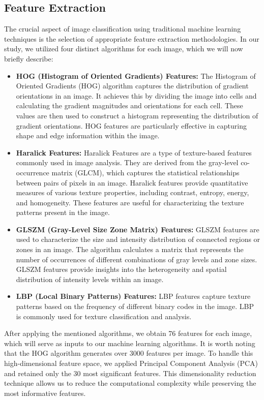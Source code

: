 \subsection{Feature Extraction}
The crucial aspect of image classification using traditional machine learning techniques is the selection of appropriate feature extraction methodologies. In our study, we utilized four distinct algorithms for each image, which we will now briefly describe:
\begin{itemize}
\item \textbf{HOG (Histogram of Oriented Gradients) Features:} The Histogram of Oriented Gradients (HOG) algorithm captures the distribution of gradient orientations in an image. It achieves this by dividing the image into cells and calculating the gradient magnitudes and orientations for each cell. These values are then used to construct a histogram representing the distribution of gradient orientations. HOG features are particularly effective in capturing shape and edge information within the image.
\item \textbf{Haralick Features:} Haralick Features are a type of texture-based features commonly used in image analysis. They are derived from the gray-level co-occurrence matrix (GLCM), which captures the statistical relationships between pairs of pixels in an image. Haralick features provide quantitative measures of various texture properties, including contrast, entropy, energy, and homogeneity. These features are useful for characterizing the texture patterns present in the image.
\item \textbf{GLSZM (Gray-Level Size Zone Matrix) Features:} GLSZM features are used to characterize the size and intensity distribution of connected regions or zones in an image. The algorithm calculates a matrix that represents the number of occurrences of different combinations of gray levels and zone sizes. GLSZM features provide insights into the heterogeneity and spatial distribution of intensity levels within an image.
\item \textbf{LBP (Local Binary Patterns) Features:} LBP features capture texture patterns based on the frequency of different binary codes in the image. LBP is commonly used for texture classification and analysis.
\end{itemize}
After applying the mentioned algorithms, we obtain 76 features for each image, which will serve as inputs to our machine learning algorithms. It is worth noting that the HOG algorithm generates over 3000 features per image. To handle this high-dimensional feature space, we applied Principal Component Analysis (PCA) and retained only the 30 most significant features. This dimensionality reduction technique allows us to reduce the computational complexity while preserving the most informative features.

